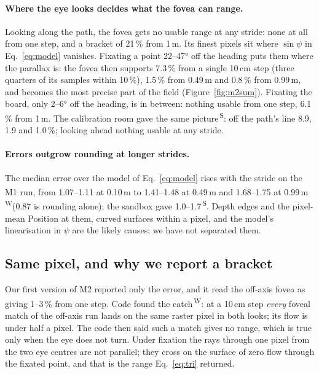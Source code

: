 \documentclass[11pt,a4paper]{article}
\newcommand{\src}[1]{\textsuperscript{\,#1}}
\newcommand{\WS}{\src{W}}   %
\newcommand{\SB}{\src{S}}   %
\begin{document}
\paragraph{Where the eye looks decides what the fovea can range.} Looking along the path, the fovea gets no usable range
at any stride: none at all from one step, and a bracket of 21\,\% from 1\,m. Its finest pixels sit where $\sin\psi$ in
Eq.~\eqref{eq:model} vanishes. Fixating a point 22--47° off the heading puts them where the parallax is: the fovea then
supports 7.3\,\% from a single 10\,cm step (three quarters of its samples within 10\,\%), 1.5\,\% from 0.49\,m and
0.8\,\% from 0.99\,m, and becomes the most precise part of the field (Figure~\ref{fig:m2sum}). Fixating the board, only
2--6° off the heading, is in between: nothing usable from one step, 6.1\,\% from 1\,m. The calibration room gave the
same picture\SB: off the path's line 8.9, 1.9 and 1.0\,\%; looking ahead nothing usable at any stride.

\paragraph{Errors outgrow rounding at longer strides.} The median error over the model of Eq.~\eqref{eq:model} rises with
the stride on the M1 run, from 1.07--1.11 at 0.10\,m to 1.41--1.48 at 0.49\,m and 1.68--1.75 at 0.99\,m\WS (0.87 is
rounding alone); the sandbox gave 1.0--1.7\SB. Depth edges and the pixel-mean Position at them, curved surfaces within a
pixel, and the model's linearisation in $\psi$ are the likely causes; we have not separated them.

\subsection{Same pixel, and why we report a bracket}\label{sec:samepixel}

Our first version of M2 reported only the error, and it read the off-axis fovea as giving 1--3\,\% from one step. Code
found the catch\WS: at a 10\,cm step \emph{every} foveal match of the off-axis run lands on the same raster pixel in both
looks; its flow is under half a pixel. The code then said such a match gives no range, which is true only when the eye
does not turn. Under fixation the rays through one pixel from the two eye centres are not parallel; they cross on the
surface of zero flow through the fixated point, and that is the range Eq.~\eqref{eq:tri} returned.
\end{document}
